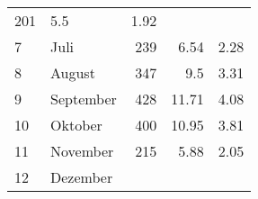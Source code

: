 \begin{longtable}{lXrrr}
       \num{201} &
       \num[round-mode=places,round-precision=2]{5.5} &
         \num[round-mode=places,round-precision=2]{1.92} \\

     7 &
     \multicolumn{1}{X}{ Juli   } &


       \num{239} &
       \num[round-mode=places,round-precision=2]{6.54} &
         \num[round-mode=places,round-precision=2]{2.28} \\

     8 &
     \multicolumn{1}{X}{ August   } &


       \num{347} &
       \num[round-mode=places,round-precision=2]{9.5} &
         \num[round-mode=places,round-precision=2]{3.31} \\

     9 &
     \multicolumn{1}{X}{ September   } &


       \num{428} &
       \num[round-mode=places,round-precision=2]{11.71} &
         \num[round-mode=places,round-precision=2]{4.08} \\

     10 &
     \multicolumn{1}{X}{ Oktober   } &


       \num{400} &
       \num[round-mode=places,round-precision=2]{10.95} &
         \num[round-mode=places,round-precision=2]{3.81} \\

     11 &
     \multicolumn{1}{X}{ November   } &


       \num{215} &
       \num[round-mode=places,round-precision=2]{5.88} &
         \num[round-mode=places,round-precision=2]{2.05} \\

     12 &
     \multicolumn{1}{X}{ Dezember   } &



\end{longtable}
